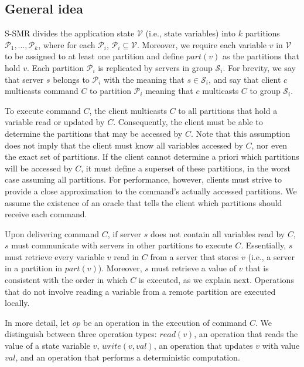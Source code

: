 \documentclass[11pt]{article}
\newcommand{\ppm}{\mathcal{P}}
\newcommand{\vvm}{\mathcal{V}}
\newcommand{\ssm}{\mathcal{S}}
\begin{document}
\subsection{General idea}
\label{sec:generalidea}

S-SMR divides the application state $\vvm$ (i.e., state variables) into $k$ partitions $\ppm_1, ..., \ppm_k$, where for each $\ppm_i$, $\ppm_i \subseteq \vvm$.
Moreover, we require each variable $v$ in $\vvm$ to be assigned to at least one partition and define $part(v)$ as the partitions that hold $v$.
Each partition $\ppm_i$ is replicated by servers in group $\ssm_i$.
For brevity, we say that server $s$ belongs to $\ppm_i$ with the meaning that $s \in \ssm_i$, and say that client $c$ multicasts command $C$ to partition $\ppm_i$ meaning that $c$ multicasts $C$ to group $\ssm_i$.

To execute command $C$, the client multicasts $C$ to all partitions that hold a variable read or updated by $C$.
Consequently, the client must be able to determine the partitions that may be accessed by $C$.
Note that this assumption does not imply that the client must know all variables accessed by $C$, nor even the exact set of partitions.
If the client cannot determine a priori which partitions will be accessed by $C$, it must define a superset of these partitions, in the worst case assuming all partitions.
For performance, however, clients must strive to provide a close approximation to the command's actually accessed partitions.
We assume the existence of an oracle that tells the client which partitions should receive each command.

Upon delivering command $C$, if server $s$ does not contain all variables read by $C$, $s$ must communicate with servers in other partitions to execute $C$.
Essentially, $s$ must retrieve every variable $v$ read in $C$ from a server that stores $v$ (i.e., a server in a partition in $part(v)$).
Moreover, $s$ must retrieve a value of $v$ that is consistent with the order in which $C$ is executed, as we explain next.
Operations that do not involve reading a variable from a remote partition are executed locally.

In more detail, let $op$ be an operation in the execution of command $C$.
We distinguish between three operation types: $read(v)$, an operation that reads the value of a state variable $v$, $write(v, val)$, an operation that updates $v$ with value $val$,
and an operation that performs a deterministic computation.
\end{document}
